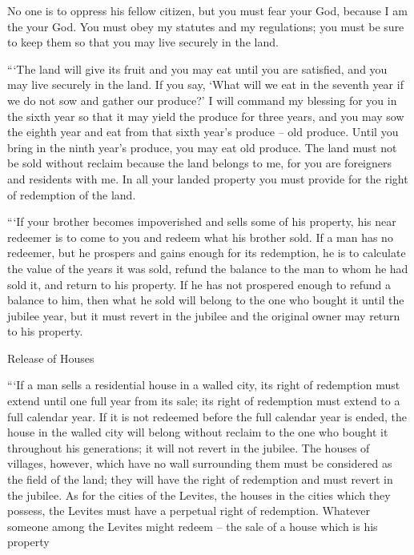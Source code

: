 {No
one is to oppress
his fellow
citizen,
but you must fear
your God,
because
I am
the {}
your God.
You must obey
my statutes
and my regulations;
you must be sure
to keep
them so
that you may live
securely
in
the land.
\par }{\PP {}“‘The land
will give
its fruit
and you may eat
until you are satisfied,
and you may live
securely in the land.
If
you say,
‘What
will we eat
in the seventh
year
if
we do not
sow
and gather
our produce?’
I will command
my blessing
for you in the sixth
year
so
that it may yield
the produce
for three
years,
and you may sow
the eighth
year
and eat
from
that sixth year’s produce –
old
produce. Until
you bring in
the ninth
year’s
produce,
you may eat
old produce.
The land
must not
be sold
without reclaim
because
the land
belongs to me, for
you
are foreigners
and residents
with me.
In all
your landed
property
you must provide
for the right of redemption
of the land.
\par }{\PP {}“‘If
your brother
becomes impoverished
and sells
some of his property,
his near
redeemer
is to
come
to you and redeem
what his brother
sold.
If a man
has
no
redeemer,
but he prospers
and gains
enough
for its redemption,
he
is to calculate
the value
of the
years
it was sold,
refund
the balance
to the
man
to whom
he had sold
it, and return
to his property.
If
he has not
prospered
enough
to refund
a balance
to him, then
what he sold
will belong to the one who bought
it until
the jubilee
year,
but it must revert
in the jubilee
and the original owner may return
to his property.
\par }{\SH Release of Houses
\par }{\PP {}“‘If
a man
sells
a residential
house
in a walled
city,
its right of redemption
must extend until
one full year
from its sale;
its right of redemption
must extend
to a full calendar year.
If
it is not
redeemed
before
the full
calendar
year
is ended, the house
in the walled
city
will belong
without
reclaim
to the one who bought
it throughout his generations;
it will not
revert
in the jubilee.
The houses
of villages,
however, which
have no
wall
surrounding
them must be considered
as the field
of the land;
they will have the right of redemption
and must revert
in the jubilee.
As for the cities
of the Levites,
the houses
in the cities
which they possess,
the Levites
must have a perpetual
right of redemption.
Whatever
someone among the Levites
might redeem
– the sale
of a house
which is his property
}
